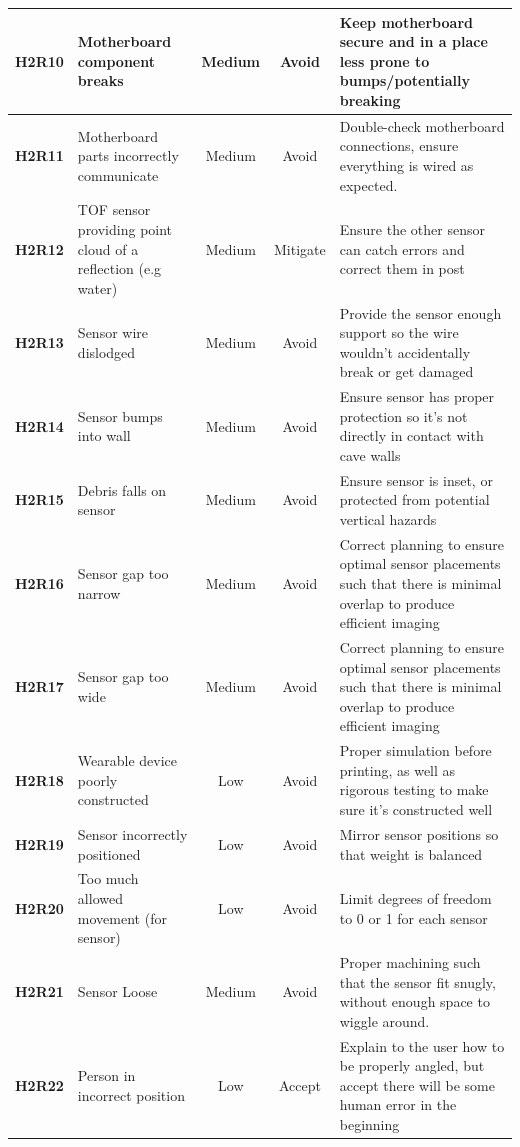 \documentclass[11pt]{article}
\begin{document}
\begin{tabularx}{\textwidth}{ c  p{}  c  c  X }
				\hline
				\textbf{H2R10} & Motherboard component breaks & Medium & Avoid  & Keep motherboard secure and in a place less prone to bumps/potentially breaking \\ 
				\hline
				\textbf{H2R11} & Motherboard parts incorrectly communicate & Medium  & Avoid  & Double-check motherboard connections, ensure everything is wired as expected. \\ 
				\hline
				\textbf{H2R12} & TOF sensor providing point cloud of a reflection (e.g water)  & Medium  & Mitigate  & Ensure the other sensor can catch errors and correct them in post \\ 
				\hline
				\textbf{H2R13} & Sensor wire dislodged & Medium  & Avoid  & Provide the sensor enough support so the wire wouldn't accidentally break or get damaged \\ 
				\hline
				\textbf{H2R14} & Sensor bumps into wall & Medium  & Avoid  & Ensure sensor has proper protection so it's not directly in contact with cave walls \\ 
				\hline
				\textbf{H2R15} & Debris falls on sensor & Medium  & Avoid  & Ensure sensor is inset, or protected from potential vertical hazards \\ 
				\hline
				\textbf{H2R16} & Sensor gap too narrow & Medium  & Avoid & Correct planning to ensure optimal sensor placements such that there is minimal overlap to produce efficient imaging\\ 
				\hline
				\textbf{H2R17} & Sensor gap too wide & Medium  & Avoid  &  Correct planning to ensure optimal sensor placements such that there is minimal overlap to produce efficient imaging\\ 
				\hline
				\textbf{H2R18} & Wearable device poorly constructed & Low  & Avoid  & Proper simulation before printing, as well as rigorous testing to make sure it's constructed well \\ 
				\hline
				\textbf{H2R19} & Sensor incorrectly positioned & Low  & Avoid  &  Mirror sensor positions so that weight is balanced\\ 
				\hline
				\textbf{H2R20} & Too much allowed movement (for sensor) & Low & Avoid  & Limit degrees of freedom to 0 or 1 for each sensor \\ 
				\hline
				\textbf{H2R21} & Sensor Loose & Medium  & Avoid  & Proper machining such that the sensor fit snugly, without enough space to wiggle around. \\ 
				\hline
				\textbf{H2R22} & Person in incorrect position & Low  & Accept  & Explain to the user how to be properly angled, but accept there will be some human error in the beginning \\ 

\end{tabularx}
\end{document}
